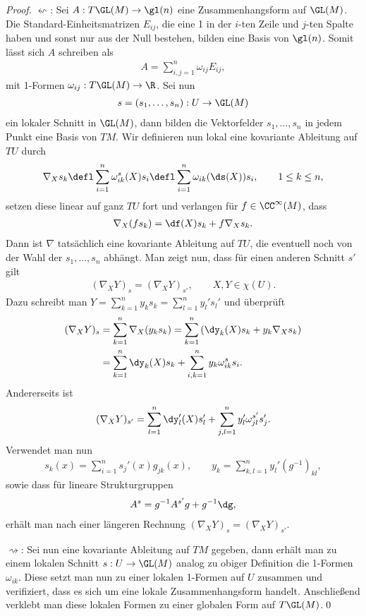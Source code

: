 \documentclass[%
	paper=a5,%
	fleqn,%
	DIV=18,%
	BCOR=0mm,
	fontsize=11pt,
	titlepage=false,%
	bibliography=totoc,
	DIV=18,%
	twoside=true,
	pdftitle=Riemannsche Geometrie,
	pdfauthor=Uwe Semmelmann,
	numbers=noendperiod]%
	{scrbook}
\begin{document}
\begin{proof}

$\leftsquigarrow$: Sei $A: T\GL(M) \to \gl(n)$ eine Zusammenhangsform auf
$\GL(M)$. Die Standard-Einheitsmatrizen $E_{ij}$, die eine 1 in der $i$-ten
Zeile und $j$-ten Spalte haben und sonst nur aus der Null bestehen, bilden eine
Basis von $\gl(n)$. Somit lässt sich $A$ schreiben als
\begin{align*}
A = \sum_{i,j=1}^n \omega_{ij} E_{ij},
\end{align*}
mit 1-Formen $\omega_{ij}: T\GL(M)\to \R$. Sei nun 
\begin{align*}
s=(s_1,\ldots,s_n): U\to \GL(M)
\end{align*}
ein lokaler Schnitt in $\GL(M)$, dann bilden die Vektorfelder $s_1,\ldots,s_n$
in jedem Punkt eine Basis von $TM$. Wir definieren nun lokal eine kovariante
Ableitung auf $TU$ durch
\begin{align*}
\nabla_X s_k \defl \sum_{i=1}^n \omega_{ik}^s(X)s_i
\defl \sum_{i=1}^n \omega_{ik}(\ds(X))s_i,\qquad 1\le k\le n,
\end{align*}
setzen diese linear auf ganz $TU$ fort und verlangen für $f\in\CC^\infty(M)$,
dass
\begin{align*}
\nabla_X (f s_k) = \df(X) s_k + f\nabla_X s_k.
\end{align*}
Dann ist $\nabla$ tatsächlich eine kovariante Ableitung auf $TU$, die eventuell
noch von der Wahl der $s_1,\ldots,s_n$ abhängt. Man zeigt nun, dass für einen
anderen Schnitt $s'$ gilt
\begin{align*}
(\nabla_X Y)_s = (\nabla_X Y)_{s'},\qquad X,Y\in\chi(U).
\end{align*}
Dazu schreibt man $Y = \sum_{k=1}^n y_k s_k = \sum_{l=1}^n y_l' s_l'$ und
überprüft
\begin{align*}
(\nabla_X Y)_s &= 
\sum_{k=1}^n \nabla_X (y_k s_k)
= \sum_{k=1}^n \left(\dy_k(X) s_k + y_k \nabla_X s_k\right)\\
&= \sum_{k=1}^n \dy_k(X) s_k   + \sum_{i,k=1}^n y_k \omega_{ik}^s s_i.
\end{align*}
Andererseits ist
\begin{align*}
(\nabla_X Y)_{s'} = 
\sum_{l=1}^n \dy_l'(X) s_l'   + \sum_{j,l=1}^n y_l' \omega_{jl}^{s'} s_j'.
\end{align*}
Verwendet man nun
\begin{align*}
s_k(x) = \sum_{i=1}^n s_j'(x)g_{jk}(x),\qquad y_k =
\sum_{k,l=1}^ny_l'(g^{-1})_{kl},
\end{align*}
sowie dass für lineare Strukturgruppen
\begin{align*}
A^s = g^{-1}A^{s'}g + g^{-1}\dg,
\end{align*}
erhält man nach einer längeren Rechnung $(\nabla_X Y)_s = (\nabla_X Y)_{s'}$.

$\rightsquigarrow$: Sei nun eine kovariante Ableitung auf $TM$ gegeben, dann
erhält man zu einem lokalen Schnitt $s: U \to \GL(M)$ analog zu obiger
Definition die 1-Formen $\omega_{ik}$. Diese setzt man nun zu einer lokalen
1-Formen auf $U$ zusammen und verifiziert, dass es sich um eine
lokale Zusammenhangsform handelt. Anschließend verklebt man diese lokalen Formen
zu einer globalen Form auf $T\GL(M)$.\qed
\end{proof}
\end{document}
